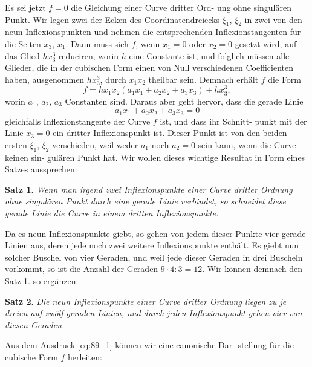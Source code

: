 \documentclass[12pt,a4paper]{article}
\theoremstyle{plain}
\newtheorem{satz}{Satz}[section]
\theoremstyle{definition}
\theoremstyle{remark}
\begin{document}
Es sei jetzt $f = 0$ die Gleichung einer Curve dritter Ord-
ung ohne singulären Punkt. Wir legen zwei der Ecken des
Coordinatendreiecks $\xi_1$, $\xi_2$ in zwei von den neun Inflexionspunkten
und nehmen die entsprechenden Inflexionstangenten für die
Seiten $x_3$, $x_1$. Dann muss sich $f$, wenn $x_1 = 0$ oder $x_2 = 0$ gesetzt
wird, auf das Glied $hx_3^3$ reduciren, worin $h$ eine Constante ist,
und folglich müssen alle Glieder, die in der cubischen Form
einen von Null verschiedenen Coefficienten haben, ausgenommen
$hx_3^3$, durch $x_1 x_2$ theilbar sein. Demnach erhält $f$ die Form
\begin{equation}\label{eq:89_1}
f = h x_1 x_2 (a_1 x_1 + a_2 x_2 + a_3 x_3) + h x_3^3,
\end{equation}
worin $a_1$, $a_2$, $a_3$ Constanten sind. Daraus aber geht hervor, dass
die gerade Linie
\begin{equation*}
a_1 x_1 + a_2 x_2 + a_3 x_3 = 0
\end{equation*}
gleichfalls Inflexionstangente der Curve $f$ ist, und dass ihr Schnitt-
punkt mit der Linie $x_3 = 0$ ein dritter Inflexionspunkt ist.
Dieser Punkt ist von den beiden ersten $\xi_1$, $\xi_2$ verschieden, weil
weder $a_1$ noch $a_2 = 0$ sein kann, wenn die Curve keinen sin-
gulären Punkt hat. Wir wollen dieses wichtige Resultat in Form
eines Satzes aussprechen:

\begin{satz}
Wenn man irgend zwei Inflexionspunkte einer
Curve dritter Ordnung ohne singulären Punkt
durch eine gerade Linie verbindet, so schneidet
diese gerade Linie die Curve in einem dritten
Inflexionspunkte.
\end{satz}

Da es neun Inflexionspunkte giebt, so gehen von jedem
dieser Punkte vier gerade Linien aus, deren jede noch zwei
weitere Inflexionspunkte enthält. Es giebt nun
solcher Buschel von vier Geraden, und weil jede dieser Geraden in drei Buscheln
vorkommt, so ist die Anzahl der Geraden $9 \cdot 4 : 3 = 12$. Wir
können demnach den Satz 1. so ergänzen:

\begin{satz}
Die neun Inflexionspunkte einer Curve dritter
Ordnung liegen zu je dreien auf zwölf geraden
Linien, und durch jeden Inflexionspunkt gehen
vier von diesen Geraden.
\end{satz}

Aus dem Ausdruck \eqref{eq:89_1} können wir eine canonische Dar-
stellung für die cubische Form $f$ herleiten:
\end{document}
